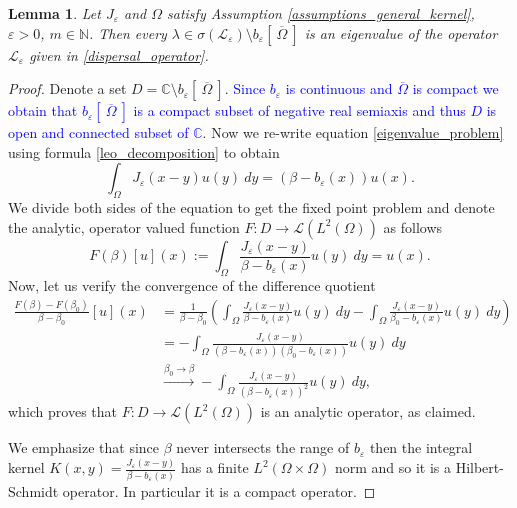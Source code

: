 \documentclass[12pt, a4paper]{article}
\theoremstyle{break}
\theoremstyle{break}
\theoremstyle{break}
\theoremstyle{break}
\newtheorem{lem}{Lemma}[section]
\theoremstyle{break}
\newcommand{\Leo}{\mathcal{L}_{\varepsilon}}
\newcommand{\Leb}{L^2\left(\Omega\right)}
\begin{document}
\begin{lem} \label{lem:spectrum_remaining_elements}
    Let $J_\varepsilon$ and $\Omega$ satisfy Assumption \ref{assumptions_general_kernel}, $\varepsilon > 0$, $m \in \mathbb{N}$. Then every $\lambda \in \sigma(\Leo) \setminus b_\varepsilon\left[\:\overline{\Omega}\:\right]$ is an eigenvalue of the operator $\Leo$ given in \eqref{dispersal_operator}.
\end{lem}
\begin{proof}
    Denote a set $D = \mathbb{C} \setminus b_\varepsilon \left[\: \overline{\Omega} \:\right]$. \textcolor{blue}{Since $b_\varepsilon$ is continuous and $\overline{\Omega}$ is compact we obtain that $b_\varepsilon \left[\: \overline{\Omega} \:\right]$ is a compact subset of negative real semiaxis and thus $D$ is open and connected subset of $\mathbb{C}$}. Now we re-write equation \eqref{eigenvalue_problem} using formula \eqref{leo_decomposition} to obtain
    \begin{equation*}
        \int_\Omega J_\varepsilon(x-y) u(y)\:dy = \left( \beta - b_\varepsilon(x)\right) u(x).
    \end{equation*}
    We divide both sides of the equation to get the fixed point problem and denote the analytic, operator valued function $F: D \rightarrow \mathcal{L}(L^2(\Omega))$ as follows
    \begin{equation*}
        F(\beta)[u](x) := \int_\Omega \frac{J_\varepsilon(x-y)}{\beta - b_\varepsilon(x)}u(y)\:dy = u(x).
    \end{equation*}
    Now, let us verify the convergence of the difference quotient
    \begin{align*}
        \frac{F(\beta) - F(\beta_0)}{\beta - \beta_0} [u] (x) 
        &= \frac{1}{\beta - \beta_0}\left(\int_\Omega \frac{J_\varepsilon(x-y)}{\beta - b_\varepsilon(x)}u(y)\:dy - \int_\Omega \frac{J_\varepsilon(x-y)}{\beta_0 - b_\varepsilon(x)}u(y)\:dy\right) \\
        &= -\int_\Omega \frac{J_\varepsilon(x-y)}{(\beta - b_\varepsilon(x))(\beta_0 - b_\varepsilon(x))}u(y)\:dy \\
        &\xrightarrow{\beta_0 \rightarrow \beta} -\int_\Omega \frac{J_\varepsilon(x-y)}{(\beta - b_\varepsilon(x))^2}u(y)\:dy,
    \end{align*}
    which proves that $F: D \rightarrow \mathcal{L}(\Leb)$ is an analytic operator, as claimed.
    
    We emphasize that since $\beta$ never intersects the range of $b_\varepsilon$ then the integral kernel $K(x,y) = \frac{J_\varepsilon(x-y)}{\beta - b_\varepsilon(x)}$ has a finite $L^2(\Omega \times \Omega)$ norm and so it is a Hilbert-Schmidt operator. In particular it is a compact operator. 
    

\end{proof}
\end{document}
